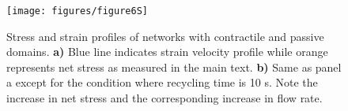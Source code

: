 \documentclass[10pt,letterpaper]{article}
\begin{document}
\begin{figure}[h!]
\centering
\texttt{[image: figures/figure6S]}
\caption{\label{fig:combo_prof}  Stress and strain profiles of networks with contractile and passive domains.  \textbf{a)} Blue line indicates strain velocity profile while orange represents net stress as measured in the main text. \textbf{b)} Same as panel a except for the condition where recycling time is 10 s.  Note the increase in net stress and the corresponding increase in flow rate. }
\end{figure}
\end{document}
